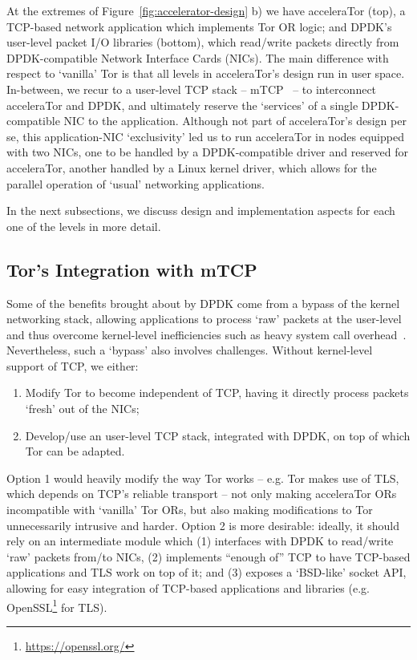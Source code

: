 \documentclass[conference]{IEEEtran}
\begin{document}
At the extremes of Figure~\ref{fig:accelerator-design} b) we have acceleraTor (top), a TCP-based network 
application which implements Tor OR logic; and DPDK's user-level packet I\slash O 
libraries (bottom), which read\slash write packets directly 
from DPDK-compatible Network Interface Cards (NICs). 
The main difference with respect to `vanilla' Tor is that all levels in 
acceleraTor's design run in user space. In-between, we recur to a user-level 
TCP stack -- mTCP~\cite{179773} -- to interconnect acceleraTor and DPDK, 
and ultimately reserve the `services' of 
a single DPDK-compatible NIC to the application. Although not 
part of acceleraTor's design per se, this 
application-NIC `exclusivity' led us to run acceleraTor in nodes equipped with 
two NICs, one to be handled by a DPDK-compatible driver and reserved for 
acceleraTor, another handled by a Linux kernel driver, which allows for the parallel operation of `usual' 
networking applications.

In the next subsections, we discuss design and implementation aspects for each 
one of the levels in more detail.

\subsection{Tor's Integration with mTCP}
\label{subsec:design-mtcp}

Some of the benefits brought about by DPDK come from a bypass of the kernel 
networking stack, allowing applications to process `raw' packets at the 
user-level and thus overcome kernel-level inefficiencies such as heavy system 
call overhead~\cite{179773, Brouer2014}. Nevertheless, such a `bypass' also 
involves challenges. Without kernel-level support of TCP, we either: 

\begin{enumerate}
	\item Modify Tor to become independent of TCP, having it directly process 
		packets `fresh' out of the NICs;
	\item Develop\slash use an user-level TCP stack, integrated with DPDK, on 
		top of which Tor can be adapted.
\end{enumerate}

Option 1 would heavily modify the way Tor 
works -- e.g. Tor makes use of TLS, which depends on TCP's reliable transport -- not 
only making acceleraTor ORs incompatible with `vanilla' Tor ORs, 
but also making modifications to Tor unnecessarily intrusive and harder. Option 2 is 
more desirable: ideally, it should rely on an intermediate module which (1) interfaces with 
DPDK to read\slash write `raw' packets from\slash to NICs, (2) implements ``enough of'' TCP to 
have TCP-based applications and TLS work on top of it; and (3) exposes a 
`BSD-like' socket API, allowing for easy integration of TCP-based applications 
and libraries (e.g. OpenSSL\footnote{\url{https://openssl.org/}} for TLS).
\end{document}
